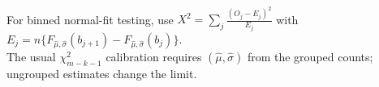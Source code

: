 \begin{remark} \label{rem:grouped-normality-chi-square-caution} \\
For binned normal-fit testing, use $X^2=\sum\limits_j\frac{(O_j-E_j)^2}{E_j}$ with $E_j=n\{F_{\widehat\mu,\widehat\sigma}(b_{j+1})-F_{\widehat\mu,\widehat\sigma}(b_j)\}$.\\
The usual $\chi^2_{m-k-1}$ calibration requires $(\widehat\mu,\widehat\sigma)$ from the grouped counts; ungrouped estimates change the limit.
\end{remark}
